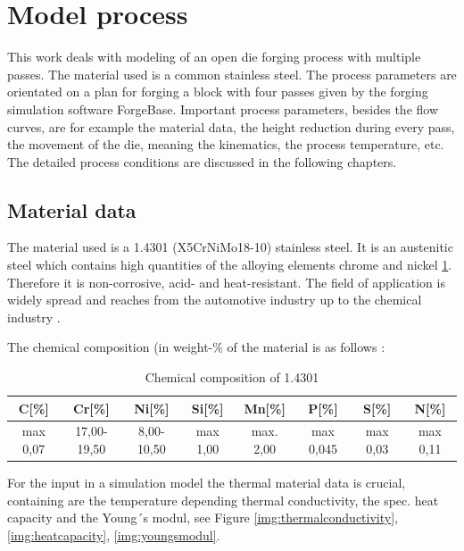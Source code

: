 \section{Model process}
This work deals with modeling of an open die forging process with multiple passes. The material used is a common stainless steel. The process parameters are orientated on a plan for forging a block with four passes given by the forging simulation software ForgeBase. Important process parameters, besides the flow curves, are for example the material data, the height reduction during every pass, the movement of the die, meaning the kinematics, the process temperature, etc. The detailed process conditions are discussed in the following chapters.\par

\subsection{Material data}
The material used is a 1.4301 (X5CrNiMo18-10) stainless steel. It is an austenitic steel which contains high quantities of the alloying elements chrome and nickel \ref{table:chemicalcomposition}. Therefore it is non-corrosive, acid- and heat-resistant. The field of application is widely spread and reaches from the automotive industry up to the chemical industry \cite{1.4301}.\par

The chemical composition (in weight-\%\) of the material is as follows \cite{metallograf.de}:\begin{table}[!htbp][width=1\textwidth]
 \centering
 \caption{Chemical composition of 1.4301}
 \begin{tabular}{|c|c|c|c|c|c|c|c|}
 \hline
 C[\%]&Cr[\%]&Ni[\%]&Si[\%]&Mn[\%]&P[\%]&S[\%]&N[\%]\\
 \hline
 max 0,07&17,00-19,50&8,00-10,50&max 1,00&max. 2,00&max 0,045&max 0,03&max 0,11
 \hline
 \label{table:chemicalcomposition}
 \end{tabular}
\end{table}\par

For the input in a simulation model the thermal material data is crucial, containing are the temperature depending thermal conductivity, the spec. heat capacity and the Young´s modul, see Figure \ref{img:thermalconductivity}, \ref{img:heatcapacity}, \ref{img:youngsmodul}. 

